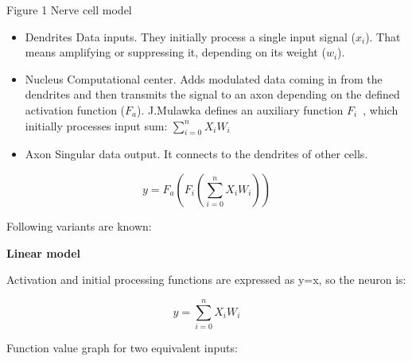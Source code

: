 \documentclass[10pt,oneside]{memoir}
\begin{document}
Figure 1 Nerve cell model


\begin{itemize}


\item Dendrites
Data inputs. They initially process a single input signal ($ {x}_{i}$). That means amplifying or suppressing it, depending on its weight ($ {w}_{i}$).

\item Nucleus
Computational center. Adds modulated data coming in from the dendrites and then transmits the signal to an axon depending on the defined activation function ($ {F}_{a}$). J.Mulawka defines an auxiliary function $ {F}_{i}$~\cite{Mulawka:1996}, which initially processes input sum: $ \sum _{i=0}^{n}{X}_{i}{W}_{i}$

\item Axon
Singular data output. It connects to the dendrites of other cells.
\end{itemize}

\begin{equation}
y={F}_{a}\left({F}_{i}\left(\sum _{i=0}^{n}{X}_{i}{W}_{i}\right)\right)
\end{equation}


Following variants are known:


\textbf{Linear model}


Activation and initial processing functions are expressed as y=x, so the neuron is:


\begin{equation}
y=\sum _{i=0}^{n}{X}_{i}{W}_{i}
\end{equation}


Function value graph for two equivalent inputs:


\begin{figure}
\begin{center}
\end{center}
\label{figure2}
\end{figure}
\end{document}
